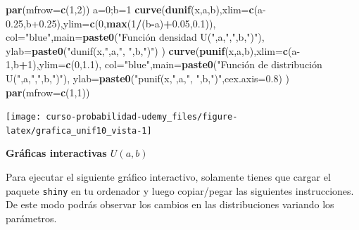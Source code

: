 \documentclass[]{book}
\newenvironment{Shaded}{\begin{snugshade}}{\end{snugshade}}
\newcommand{\DataTypeTok}[1]{\textcolor[rgb]{0.13,0.29,0.53}{#1}}
\newcommand{\DecValTok}[1]{\textcolor[rgb]{0.00,0.00,0.81}{#1}}
\newcommand{\FloatTok}[1]{\textcolor[rgb]{0.00,0.00,0.81}{#1}}
\newcommand{\KeywordTok}[1]{\textcolor[rgb]{0.13,0.29,0.53}{\textbf{#1}}}
\newcommand{\NormalTok}[1]{#1}
\newcommand{\OperatorTok}[1]{\textcolor[rgb]{0.81,0.36,0.00}{\textbf{#1}}}
\newcommand{\StringTok}[1]{\textcolor[rgb]{0.31,0.60,0.02}{#1}}
\begin{document}
\begin{Shaded}
\begin{Highlighting}[]
\KeywordTok{par}\NormalTok{(}\DataTypeTok{mfrow=}\KeywordTok{c}\NormalTok{(}\DecValTok{1}\NormalTok{,}\DecValTok{2}\NormalTok{))}
\NormalTok{a=}\DecValTok{0}\NormalTok{;b=}\DecValTok{1}
\KeywordTok{curve}\NormalTok{(}\KeywordTok{dunif}\NormalTok{(x,a,b),}\DataTypeTok{xlim=}\KeywordTok{c}\NormalTok{(a}\FloatTok{-0.25}\NormalTok{,b}\FloatTok{+0.25}\NormalTok{),}\DataTypeTok{ylim=}\KeywordTok{c}\NormalTok{(}\DecValTok{0}\NormalTok{,}\KeywordTok{max}\NormalTok{(}\DecValTok{1}\OperatorTok{/}\NormalTok{(b}\OperatorTok{-}\NormalTok{a)}\OperatorTok{+}\FloatTok{0.05}\NormalTok{,}\FloatTok{0.1}\NormalTok{)),}
      \DataTypeTok{col=}\StringTok{"blue"}\NormalTok{,}\DataTypeTok{main=}\KeywordTok{paste0}\NormalTok{(}\StringTok{"Función densidad  U("}\NormalTok{,a,}\StringTok{","}\NormalTok{,b,}\StringTok{")"}\NormalTok{),}
      \DataTypeTok{ylab=}\KeywordTok{paste0}\NormalTok{(}\StringTok{"dunif(x,"}\NormalTok{,a,}\StringTok{", "}\NormalTok{,b,}\StringTok{")"}\NormalTok{)}
\NormalTok{      )}
\KeywordTok{curve}\NormalTok{(}\KeywordTok{punif}\NormalTok{(x,a,b),}\DataTypeTok{xlim=}\KeywordTok{c}\NormalTok{(a}\DecValTok{-1}\NormalTok{,b}\OperatorTok{+}\DecValTok{1}\NormalTok{),}\DataTypeTok{ylim=}\KeywordTok{c}\NormalTok{(}\DecValTok{0}\NormalTok{,}\FloatTok{1.1}\NormalTok{),}
      \DataTypeTok{col=}\StringTok{"blue"}\NormalTok{,}\DataTypeTok{main=}\KeywordTok{paste0}\NormalTok{(}\StringTok{"Función de distribución U("}\NormalTok{,a,}\StringTok{","}\NormalTok{,b,}\StringTok{")"}\NormalTok{),}
      \DataTypeTok{ylab=}\KeywordTok{paste0}\NormalTok{(}\StringTok{"punif(x,"}\NormalTok{,a,}\StringTok{", "}\NormalTok{,b,}\StringTok{")"}\NormalTok{,}\DataTypeTok{cex.axis=}\FloatTok{0.8}\NormalTok{)}
\NormalTok{      )}
\KeywordTok{par}\NormalTok{(}\DataTypeTok{mfrow=}\KeywordTok{c}\NormalTok{(}\DecValTok{1}\NormalTok{,}\DecValTok{1}\NormalTok{))}
\end{Highlighting}
\end{Shaded}

\begin{center}\texttt{[image: curso-probabilidad-udemy\_files/figure-latex/grafica\_unif10\_vista-1]} \end{center}

\textbf{Gráficas interactivas \(U(a,b)\)}

Para ejecutar el siguiente gráfico interactivo, solamente tienes que cargar el paquete \texttt{shiny} en tu ordenador y luego copiar/pegar las siguientes instrucciones. De este modo podrás observar los cambios en las distribuciones variando los parámetros.
\end{document}
